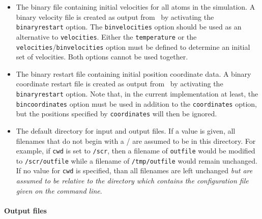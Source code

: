 \begin{itemize}
\item
{}
{\label{param:binvelocities}
The binary file containing initial velocities for all 
atoms in the simulation.  
A binary velocity file is created as output from \NAMD\ 
by activating the \verb!binaryrestart! option.  
The \verb!binvelocities! option should be used as 
an alternative to \verb!velocities!.  
Either the \verb!temperature! 
or the \verb!velocities!/\verb!binvelocities! 
option must be defined to determine an initial set of velocities.  
Both options cannot be used together.  
}

\item
{}
{
The binary restart file containing initial position 
coordinate data.  
A binary coordinate restart file is created as output from \NAMD\ 
by activating the \verb!binaryrestart! option.  
Note that, in the current implementation at least, 
the \verb!bincoordinates! option must be used in addition 
to the \verb!coordinates! option, 
but the positions specified by \verb!coordinates! will then be ignored.  
}

\item
{}
{The default directory for input and output files.  
If a value is given, all filenames that 
do not begin with a / are assumed to be in this directory.  
For example, if \verb!cwd! is set to \verb!/scr!, then a
filename of \verb!outfile! would be modified to \verb!/scr/outfile!
while a filename of \verb!/tmp/outfile! would remain unchanged.
If no value for \verb!cwd! is specified, than all filenames are 
left unchanged {\em but are assumed to be relative to the directory
which contains the configuration file given on the command line}.}

\end{itemize}

\paragraph{Output files}

